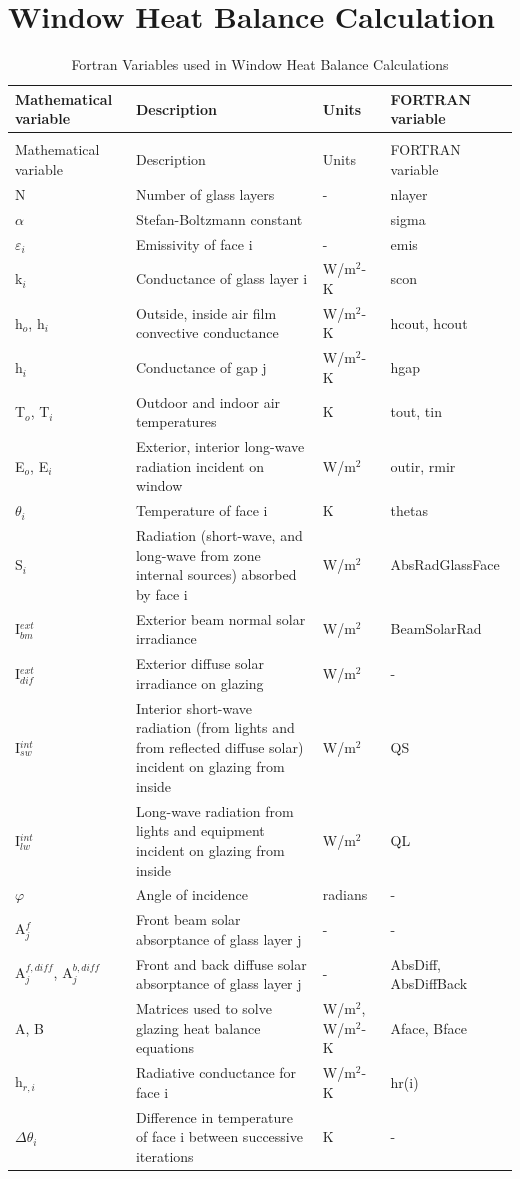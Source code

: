 \section{Window Heat Balance Calculation}\label{window-heat-balance-calculation}

\begin{longtable}[c]{p{1.0in}p{2.5in}p{1.0in}p{1.5in}}
\caption{Fortran Variables used in Window Heat Balance Calculations \label{table:fortran-variables-used-in-window-heat-balance}} \tabularnewline
\toprule 
Mathematical variable & Description & Units & FORTRAN variable \tabularnewline
\midrule
\endfirsthead

\caption[]{Fortran Variables used in Window Heat Balance Calculations} \tabularnewline
\toprule 
Mathematical variable & Description & Units & FORTRAN variable \tabularnewline
\midrule
\endhead

N & Number of glass layers & - & nlayer \tabularnewline
$\alpha$ & Stefan-Boltzmann constant & ~ & sigma \tabularnewline 
$\varepsilon$\(_{i}\) & Emissivity of face i & - & emis \tabularnewline
k\(_{i}\) & Conductance of glass layer i & W/m\(^{2}\)-K & scon \tabularnewline
h\(_{o}\), h\(_{i}\) & Outside, inside air film convective conductance & W/m\(^{2}\)-K & hcout, hcout \tabularnewline
h\(_{i}\) & Conductance of gap j & W/m\(^{2}\)-K & hgap \tabularnewline
T\(_{o}\), T\(_{i}\) & Outdoor and indoor air temperatures & K & tout, tin \tabularnewline
E\(_{o}\), E\(_{i}\) & Exterior, interior long-wave radiation incident on window & W/m\(^{2}\) & outir, rmir \tabularnewline
$\theta$\(_{i}\) & Temperature of face i & K & thetas \tabularnewline
S\(_{i}\) & Radiation (short-wave, and long-wave from zone internal sources) absorbed by face i & W/m\(^{2}\) & AbsRadGlassFace \tabularnewline
I\(^{ext}_{bm}\) & Exterior beam normal solar irradiance & W/m\(^{2}\) & BeamSolarRad \tabularnewline
I\(^{ext}_{dif}\) & Exterior diffuse solar irradiance on glazing & W/m\(^{2}\) & - \tabularnewline
I\(^{int}_{sw}\) & Interior short-wave radiation (from lights and from reflected diffuse solar) incident on glazing from inside & W/m\(^{2}\) & QS \tabularnewline
I\(^{int}_{lw}\) & Long-wave radiation from lights and equipment incident on glazing from inside & W/m\(^{2}\) & QL \tabularnewline
$\varphi$ & Angle of incidence & radians & - \tabularnewline
A\(^{f}_{j}\) & Front beam solar absorptance of glass layer j & - & - \tabularnewline
A\(^{f,diff}_{j}\), A\(^{b,diff}_{j}\) & Front and back diffuse solar absorptance of glass layer j & - & AbsDiff, AbsDiffBack \tabularnewline
A, B & Matrices used to solve glazing heat balance equations & W/m\(^{2}\), W/m\(^{2}\)-K & Aface, Bface \tabularnewline
h\(_{r,i}\) & Radiative conductance for face i & W/m\(^{2}\)-K & hr(i) \tabularnewline
$\Delta\theta$\(_{i}\) & Difference in temperature of face i between successive iterations & K & - \tabularnewline
\bottomrule
\end{longtable}

